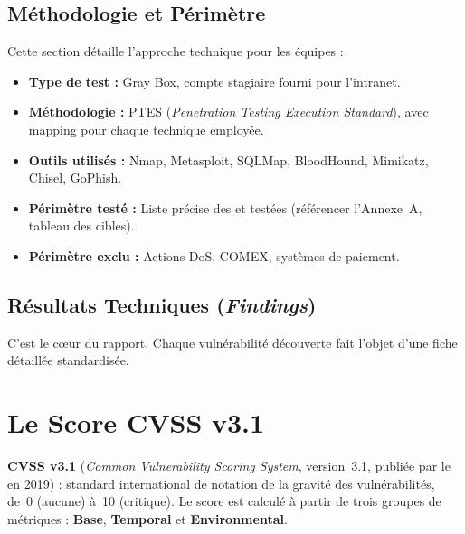 \subsection{Méthodologie et Périmètre}
\label{subsec:methodologie_rapport}

Cette section détaille l'approche technique pour les équipes  :
\begin{itemize}
    \item \textbf{Type de test :} Gray Box, compte \og{}stagiaire\fg{}
          fourni pour l'intranet.
    \item \textbf{Méthodologie :} PTES (\textit{Penetration Testing Execution
          Standard}), avec mapping  pour chaque
          technique employée.
    \item \textbf{Outils utilisés :} Nmap, Metasploit, SQLMap, BloodHound,
          Mimikatz, Chisel, GoPhish.
    \item \textbf{Périmètre testé :} Liste précise des  et 
          testées (référencer l'Annexe~A, tableau des cibles).
    \item \textbf{Périmètre exclu :} Actions DoS, COMEX, systèmes de paiement.
\end{itemize}

\subsection{Résultats Techniques (\textit{Findings})}
\label{subsec:findings}

C'est le cœur du rapport. Chaque vulnérabilité découverte fait l'objet
d'une fiche détaillée standardisée.

\section{Le Score CVSS v3.1}
\label{sec:cvss}

\begin{boxdef}
\textbf{CVSS v3.1} (\textit{Common Vulnerability Scoring System}, version~3.1,
publiée par le  en 2019) : standard international de notation
de la gravité des vulnérabilités, de~0 (aucune) à~10 (critique). Le score
est calculé à partir de trois groupes de métriques : \textbf{Base},
\textbf{Temporal} et \textbf{Environmental}.
\end{boxdef}

